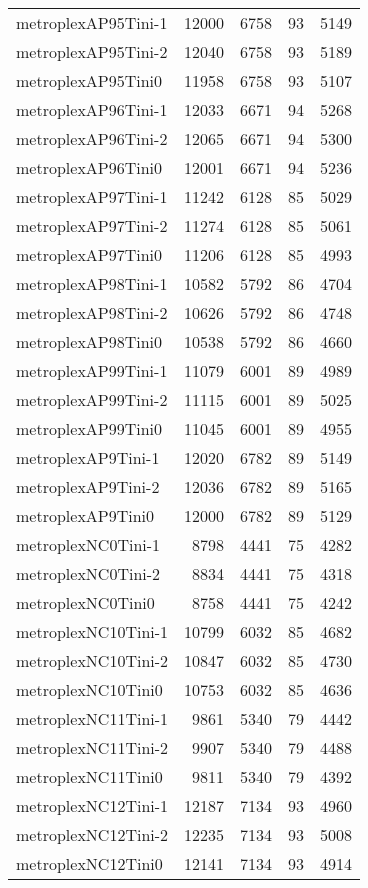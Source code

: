 \begin{longtable}{lrrrr}
metroplexAP95Tini-1 & 12000 & 6758 & 93 & 5149 \\
metroplexAP95Tini-2 & 12040 & 6758 & 93 & 5189 \\
metroplexAP95Tini0 & 11958 & 6758 & 93 & 5107 \\
metroplexAP96Tini-1 & 12033 & 6671 & 94 & 5268 \\
metroplexAP96Tini-2 & 12065 & 6671 & 94 & 5300 \\
metroplexAP96Tini0 & 12001 & 6671 & 94 & 5236 \\
metroplexAP97Tini-1 & 11242 & 6128 & 85 & 5029 \\
metroplexAP97Tini-2 & 11274 & 6128 & 85 & 5061 \\
metroplexAP97Tini0 & 11206 & 6128 & 85 & 4993 \\
metroplexAP98Tini-1 & 10582 & 5792 & 86 & 4704 \\
metroplexAP98Tini-2 & 10626 & 5792 & 86 & 4748 \\
metroplexAP98Tini0 & 10538 & 5792 & 86 & 4660 \\
metroplexAP99Tini-1 & 11079 & 6001 & 89 & 4989 \\
metroplexAP99Tini-2 & 11115 & 6001 & 89 & 5025 \\
metroplexAP99Tini0 & 11045 & 6001 & 89 & 4955 \\
metroplexAP9Tini-1 & 12020 & 6782 & 89 & 5149 \\
metroplexAP9Tini-2 & 12036 & 6782 & 89 & 5165 \\
metroplexAP9Tini0 & 12000 & 6782 & 89 & 5129 \\
metroplexNC0Tini-1 & 8798 & 4441 & 75 & 4282 \\
metroplexNC0Tini-2 & 8834 & 4441 & 75 & 4318 \\
metroplexNC0Tini0 & 8758 & 4441 & 75 & 4242 \\
metroplexNC10Tini-1 & 10799 & 6032 & 85 & 4682 \\
metroplexNC10Tini-2 & 10847 & 6032 & 85 & 4730 \\
metroplexNC10Tini0 & 10753 & 6032 & 85 & 4636 \\
metroplexNC11Tini-1 & 9861 & 5340 & 79 & 4442 \\
metroplexNC11Tini-2 & 9907 & 5340 & 79 & 4488 \\
metroplexNC11Tini0 & 9811 & 5340 & 79 & 4392 \\
metroplexNC12Tini-1 & 12187 & 7134 & 93 & 4960 \\
metroplexNC12Tini-2 & 12235 & 7134 & 93 & 5008 \\
metroplexNC12Tini0 & 12141 & 7134 & 93 & 4914 \\

\end{longtable}
